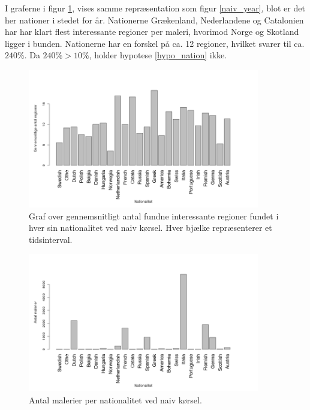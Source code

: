 {I graferne i figur \ref{naiv_nation}, vises samme repræsentation som
figur \ref{naiv_year}, blot er det her nationer i stedet for år. Nationerne
Grækenland, Nederlandene og Catalonien har har klart flest interessante
regioner per maleri, hvorimod Norge og Skotland ligger i bunden.
Nationerne har en forskel på ca. 12 regioner, hvilket svarer til ca.
$240\%$. Da $240 \% > 10 \%$, holder hypotese
\ref{hypo_nation} ikke.

\begin{figure}[!h]
	\centering
	\includegraphics[angle=0,width=0.90\textwidth]{afsnit/resultater/billeder/nationcut.png}
    \caption{Graf over gennemsnitligt antal fundne interessante regioner
    fundet i hver sin nationalitet ved naiv kørsel. Hver bjælke
    repræsenterer et tidsinterval.}
	\label{naiv_nation}
\end{figure}

\begin{figure}[!h]
	\centering
	\includegraphics[angle=0,width=0.90\textwidth]{afsnit/resultater/billeder/nationNrImage.png}
	\caption{Antal malerier per nationalitet ved naiv kørsel.}
	\label{naiv_nationNrImage}
\end{figure}

}
